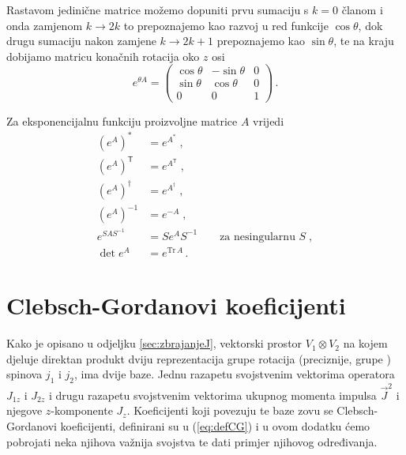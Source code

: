 Rastavom jedinične matrice možemo dopuniti prvu sumaciju s $k=0$ članom
i onda zamjenom $k\to 2k$ to prepoznajemo kao razvoj u red funkcije $\cos\theta$,
dok drugu sumaciju nakon zamjene $k \to  2k+1$ prepoznajemo kao $\sin\theta$,
te na kraju dobijamo matricu konačnih rotacija oko $z$ osi
\begin{equation}
    e^{\theta A} =  
            \begin{pmatrix}
                \cos\theta & -\sin\theta & 0 \\
                \sin\theta & \cos\theta & 0 \\
                0 & 0 & 1
            \end{pmatrix} \,.
\end{equation}

Za eksponencijalnu funkciju proizvoljne matrice $A$ vrijedi
\begin{align}
    \left(e^A\right)^* &= e^{A^*} \;,  \\
    \left(e^A\right)^\mathsf{T} &= e^{A^\mathsf{T}} \;,  \\
    \left(e^A\right)^\dagger &= e^{A^\dagger} \;,  \\
    \left(e^A\right)^{-1} &= e^{-A} \;,  \\
    e^{SAS^{-1}} &= Se^{A}S^{-1} \qquad \text{za nesingularnu $S$} \;,  \\
    \det e^{A} &= e^{\mathrm{Tr}\,A} \,. \label{eq:dettr}
\end{align}

\chapter{Clebsch-Gordanovi koeficijenti}
\label{sec:clebsch}

Kako je opisano u odjeljku \ref{sec:zbrajanjeJ}, vektorski prostor
$V_1 \otimes V_2$ na kojem djeluje direktan produkt dviju reprezentacija
grupe rotacija (preciznije, grupe ) spinova $j_1$ i $j_2$, ima
dvije baze. Jednu razapetu svojstvenim vektorima operatora $J_{1z}$
i $J_{2z}$ i drugu razapetu svojstvenim vektorima ukupnog momenta
impulsa  $\vec{J}^2$ i njegove $z$-komponente $J_z$.
Koeficijenti koji povezuju te baze zovu se Clebsch-Gordanovi koeficijenti,
definirani su u (\ref{eq:defCG}) i u ovom dodatku ćemo pobrojati neka
njihova važnija svojstva te dati primjer njihovog određivanja.

